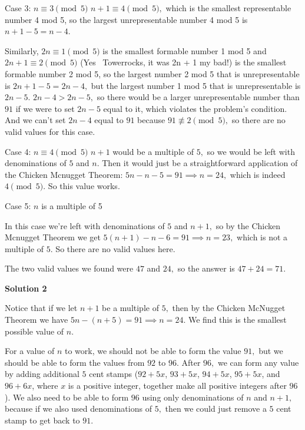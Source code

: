 \begin{enumerate}
 
Case 3: $n \equiv 3 \pmod{5}$
$n + 1 \equiv 4 \pmod{5},$ which is the smallest representable number 4 mod 5, so the largest unrepresentable number 4 mod 5 is $n + 1 - 5 = n -4.$ 

 Similarly, $2n \equiv 1 \pmod{5}$ is the smallest formable number 1 mod 5 and $2n + 1 \equiv 2 \pmod{5}$ (Yes ~Towerrocks, it was 2n + 1 my bad!) is the smallest formable number 2 mod 5, so the largest number 2 mod 5 that is unrepresentable is $2n + 1 - 5 = 2n - 4,$ but the largest number 1 mod 5 that is unrepresentable is $2n -5.$ $2n - 4 > 2n - 5,$ so there would be a larger unrepresentable number than $91$ if we were to set $2n - 5$ equal to it, which violates the problem's condition. And we can't set $2n - 4$ equal to $91$ because $91 \not\equiv 2 \pmod{5},$ so there are no valid values for this case.

 


 Case 4: $n \equiv 4 \pmod{5}$
$n + 1$ would be a multiple of $5,$ so we would be left with denominations of $5$ and $n.$ Then it would just be a straightforward application of the Chicken Mcnugget Theorem: $5n - n - 5 = 91 \implies n = 24,$ which is indeed $4 \pmod{5}.$ So this value works.

 
Case 5: $n$ is a multiple of 5 

 In this case we’re left with denominations of $5$ and $n + 1,$ so by the Chicken Mcnugget Theorem we get $5(n + 1) - n - 6 = 91 \implies n = 23,$ which is not a multiple of $5.$ So there are no valid values here.

 
The two valid values we found were $47$ and $24,$ so the answer is $47 + 24 = \boxed{71}.$




\textbf{Solution 2}

Notice that if we let $n + 1$ be a multiple of $5,$ then by the Chicken McNugget Theorem we have $5n - (n + 5) = 91 \implies n = 24.$ We find this is the smallest possible value of $n$.

 For a value of $n$ to work, we should not be able to form the value $91,$ but we should be able to form the values from $92$ to $96$. After $96,$ we can form any value by adding additional $5$ cent stamps ($92 + 5x$, $93 + 5x$, $94 + 5x$, $95 + 5x$, and $96 + 6x$, where $x$ is a positive integer, together make all positive integers after $96$). We also need to be able to form $96$ using only denominations of $n$ and $n + 1,$ because if we also used denominations of $5,$ then we could just remove a $5$ cent stamp to get back to $91.$


\end{enumerate}
